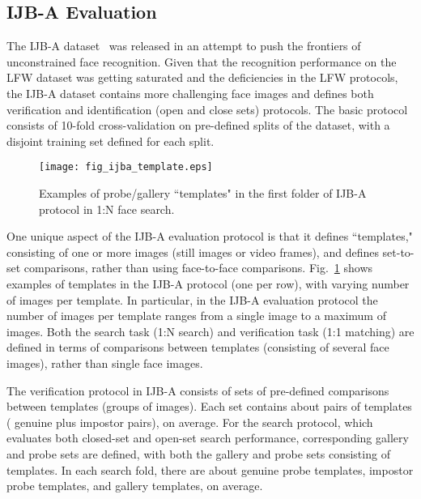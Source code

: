 \documentclass[10pt,journal,compsoc]{IEEEtran}
\begin{document}
\subsection{IJB-A Evaluation}
The IJB-A dataset~\cite{db:janus} was released in an attempt to push the frontiers of unconstrained face recognition. Given that the recognition performance on the LFW dataset was getting saturated and the deficiencies in the LFW protocols, the IJB-A dataset contains more challenging face images and defines both verification and identification (open and close sets) protocols. The basic protocol consists of 10-fold cross-validation on pre-defined splits of the dataset, with a disjoint training set defined for each split.
\begin{figure}[htbp]
    \centering
    \texttt{[image: fig\_ijba\_template.eps]}
    \caption{Examples of probe/gallery ``templates" in the first folder of IJB-A protocol in 1:N face search.}\label{fig:tempaltes}
\end{figure}

One unique aspect of the IJB-A evaluation protocol is that it defines ``templates," consisting of one or more images (still images or video frames), and defines set-to-set comparisons, rather than using face-to-face comparisons. Fig.~\ref{fig:tempaltes} shows examples of templates in the IJB-A protocol (one per row), with varying number of images per template. In particular, in the IJB-A evaluation protocol the number of images per template ranges from a single image to a maximum of  images.  Both the search task (1:N search) and verification task (1:1 matching) are defined in terms of comparisons between templates (consisting of several face images), rather than single face images.

The verification protocol in IJB-A consists of  sets of pre-defined comparisons between templates (groups of images). Each set contains about  pairs of templates ( genuine plus  impostor pairs), on average.
For the search protocol, which evaluates both closed-set and open-set search performance,  corresponding gallery and probe sets are defined, with both the gallery and probe sets consisting of templates. In each search fold, there are about  genuine probe templates,  impostor probe templates, and  gallery templates, on average.
\end{document}
